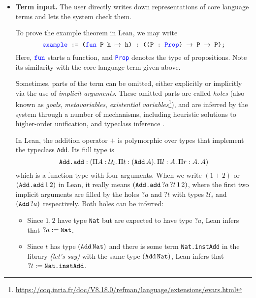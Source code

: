 \documentclass[twoside]{report}
\begin{document}
\begin{itemize}
    \item \textbf{Term input.} The user directly writes down representations of core language terms and lets the system check them.

    \begin{example}
    To prove the example theorem in Lean, we may write
    $$\texttt{\textcolor{blue}{example} := (\textcolor{blue}{fun} P h $\mapsto$ h) :\ ((P : \textcolor{blue}{Prop}) $\rightarrow$ P $\rightarrow$ P);}$$
    Here, $\texttt{\textcolor{blue}{fun}}$ starts a function, and \texttt{\textcolor{blue}{Prop}} denotes the type of propositions. Note its similarity with the core language term given above.
    \end{example}
    
    Sometimes, parts of the term can be omitted, either explicitly or implicitly via the use of \emph{implicit arguments}. These omitted parts are called \emph{holes} (also known as \emph{goals}, \emph{metavariables}, \emph{existential variables}\footnote{\url{https://coq.inria.fr/doc/V8.18.0/refman/language/extensions/evars.html}}), and are inferred by the system through a number of mechanisms, including heuristic solutions to higher-order unification, and typeclass inference \cite{de2015lean,mahboubi2013canonical}.

    \begin{example}
    In Lean, the addition operator $+$ is polymorphic over types that implement the typeclass \texttt{Add}. Its full type is $$\texttt{Add.add} : (\Pi{A} : {\mathcal U_i}.\,{\Pi{t} : {({\texttt{Add}}\,{A})}.\,{\Pi{l} : {A}.\,{\Pi{r} : {A}.\,{A}}}})$$ which is a function type with four arguments. When we write $(1 + 2)$ or $({{\texttt{Add.add}}\,{1}}\,{2})$ in Lean, it really means $({{{{\texttt{Add.add}}\,{?a}}\,{?t}}\,{1}}\,{2})$, where the first two implicit arguments are filled by the holes ${?a}$ and ${?t}$ with types ${\mathcal U_i}$ and $({\texttt{Add}}\,{?a})$ respectively. Both holes can be inferred:
    \begin{itemize}
        \item Since $1, 2$ have type \texttt{Nat} but are expected to have type ${?a}$, Lean infers that ${?a} := \texttt{Nat}$.
        \item Since $t$ has type $({\texttt{Add}}\,{\texttt{Nat}})$ and there is some term \texttt{Nat.instAdd} in the library \emph{(let's say)} with the same type $({\texttt{Add}}\,{\texttt{Nat}})$, Lean infers that ${?t} := \texttt{Nat.instAdd}$.
    \end{itemize}
    \end{example}
    

\end{itemize}
\end{document}
